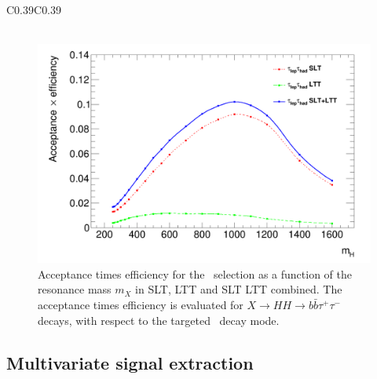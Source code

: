 \begin{table}[!htbp]
{\begin{tabular}{C{0.39\textwidth}C{0.39\textwidth}}
 \\
\\
 \bottomrule
 \end{tabular}
 }
 \caption{Summary of the event selections, 
 shown separately for the SLT and LTT. 
In cases where pairs of reconstructed objects of the same type are required, 
thresholds on the (sub-)leading $p_\text{T}$ object are given 
outside (within) parentheses. 
When the selection depends on the year of data-taking, 
the possible values of the requirements are separated by commas, 
except for the jet selection in the 
LTT channel which use multiple selection criteria as described 
in Section~\ref{sec:DiHiggs:triggers}. 
The trigger $p_\text{T}$ thresholds shown correspond to the offline requirements.}
\label{tab:DiHiggs:selectionsummary}
\end{table}

\begin{figure}[!htbp]
\centering
\includegraphics[width=0.85\linewidth]{DiHiggs/plots/acc_eff.png}
\caption{Acceptance times efficiency for the \lephad\ selection 
as a function of the resonance mass $m_X$ in
SLT, LTT and SLT LTT combined.
The acceptance times efficiency is evaluated 
for $X\to HH\to b\bar{b}\tau^+\tau^-$ decays, 
with respect to the targeted \lephad\ decay mode.}
\label{fig:selection:acceptances}
\end{figure}

\subsection{Multivariate signal extraction}
\label{sec:DiHiggs:MVA}

